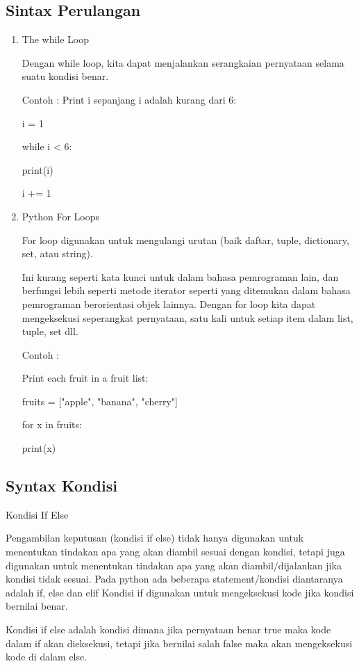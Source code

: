 \subsection{Sintax Perulangan}
\begin{enumerate}
\item The while Loop

Dengan while loop, kita dapat menjalankan serangkaian pernyataan selama suatu kondisi benar.

Contoh : 
Print i sepanjang i adalah kurang dari 6:

i = 1

while i < 6:

  print(i)
  
  i += 1

\item Python For Loops

For loop digunakan untuk mengulangi urutan (baik daftar, tuple, dictionary,  set, atau string).

Ini kurang seperti kata kunci untuk dalam bahasa pemrograman lain, dan berfungsi lebih seperti metode iterator seperti yang ditemukan dalam bahasa pemrograman berorientasi objek lainnya.
Dengan for loop kita dapat mengeksekusi seperangkat pernyataan, satu kali untuk setiap item dalam list, tuple, set dll.

Contoh :

Print each fruit in a fruit list:

fruits = ["apple", "banana", "cherry"]

for x in fruits:

  print(x)

\end{enumerate}

\subsection{Syntax Kondisi}

Kondisi If Else

Pengambilan keputusan (kondisi if else) tidak hanya digunakan untuk menentukan tindakan apa yang akan diambil sesuai dengan kondisi, tetapi juga digunakan untuk menentukan tindakan apa yang akan diambil/dijalankan jika kondisi tidak sesuai.
Pada python ada beberapa statement/kondisi diantaranya adalah if, else dan elif Kondisi if digunakan untuk mengeksekusi kode jika kondisi bernilai benar.

Kondisi if else adalah kondisi dimana jika pernyataan benar true maka kode dalam if akan dieksekusi, tetapi jika bernilai salah false maka akan mengeksekusi kode di dalam else.

